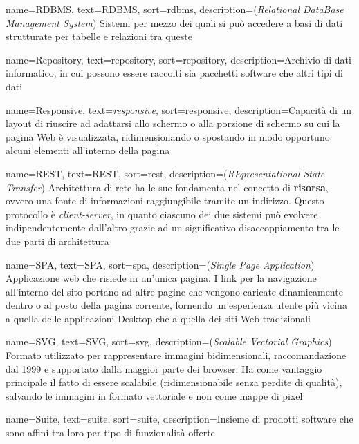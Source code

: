 {
    name={RDBMS},
    text=RDBMS,
    sort=rdbms,
    description={(\emph{Relational DataBase Management System}) Sistemi per mezzo dei quali si può accedere a basi di dati strutturate per tabelle e relazioni tra queste}
}

{
    name={Repository},
    text=repository,
    sort=repository,
    description={Archivio di dati informatico, in cui possono essere raccolti sia pacchetti software che altri tipi di dati}
}

{
    name={Responsive},
    text=\emph{responsive},
    sort=responsive,
    description={Capacità di un layout di riuscire ad adattarsi allo schermo o alla porzione di schermo su cui la pagina Web è visualizzata, ridimensionando o spostando in modo opportuno alcuni elementi all'interno della pagina}
}

{
    name={REST},
    text=REST,
    sort=rest,
    description={(\emph{REpresentational State Transfer}) Architettura di rete ha le sue fondamenta nel concetto di \textbf{risorsa}, ovvero una fonte di informazioni raggiungibile tramite un indirizzo. Questo protocollo è \emph{client-server}, in quanto ciascuno dei due sistemi può evolvere indipendentemente dall'altro grazie ad un significativo disaccoppiamento tra le due parti di architettura}
}

{
    name={SPA},
    text=SPA,
    sort=spa,
    description={(\emph{Single Page Application}) Applicazione web che risiede in un'unica pagina. I link per la navigazione all'interno del sito portano ad altre pagine che vengono caricate dinamicamente dentro o al posto della pagina corrente, fornendo un'esperienza utente più vicina a quella delle applicazioni Desktop che a quella dei siti Web tradizionali}
}

{
    name={SVG},
    text=SVG,
    sort=svg,
    description={(\emph{Scalable Vectorial Graphics}) Formato utilizzato per rappresentare immagini bidimensionali, raccomandazione  dal 1999 e supportato dalla maggior parte dei browser. Ha come vantaggio principale il fatto di essere scalabile (ridimensionabile senza perdite di qualità), salvando le immagini in formato vettoriale e non come mappe di pixel}
}

{
    name={Suite},
    text=suite,
    sort=suite,
    description={Insieme di prodotti software che sono affini tra loro per tipo di funzionalità offerte}
}


